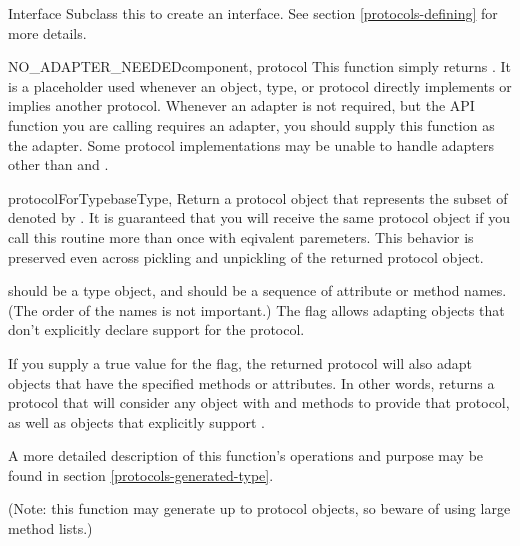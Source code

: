\begin{verbatim%
}
\begin{verbatim%
}
\begin{verbatim%
}
\begin{verbatim%
}
\begin{verbatim%
}
\begin{verbatim%
}
\begin{classdesc*}{Interface}
Subclass this to create an interface.  See section \ref{protocols-defining}
for more details.
\end{classdesc*}









\begin{funcdesc}{NO_ADAPTER_NEEDED}{component, protocol}
This function simply returns .  It is a placeholder used whenever
an object, type, or protocol directly implements or implies another protocol.
Whenever an adapter is not required, but the  API function
you are calling requires an adapter, you should supply this function as the
adapter.  Some protocol implementations may be unable to handle adapters other
than  and .
\end{funcdesc}

\begin{funcdesc}{protocolForType}{baseType,
} 
Return a protocol object that represents the subset of  denoted
by .  It is guaranteed that you will receive the same protocol
object if you call this routine more than once with eqivalent paremeters.  This
behavior is preserved even across pickling and unpickling of the returned
protocol object.

 should be a type object, and  should be a sequence
of attribute or method names.  (The order of the names is not important.)  The
 flag allows adapting objects that don't explicitly declare
support for the protocol.

If you supply a true value for the  flag, the returned protocol
will also adapt objects that have the specified methods or attributes.  In
other words,  returns a
protocol that will consider any object with  and 
methods to provide that protocol, as well as objects that explicitly support
.

A more detailed description of this function's operations and purpose may be
found in section \ref{protocols-generated-type}.

(Note: this function may generate up to  protocol
objects, so beware of using large method lists.)
\end{funcdesc}







\end{verbatim%
}
\end{verbatim%
}
\end{verbatim%
}
\end{verbatim%
}
\end{verbatim%
}
\end{verbatim%
}
